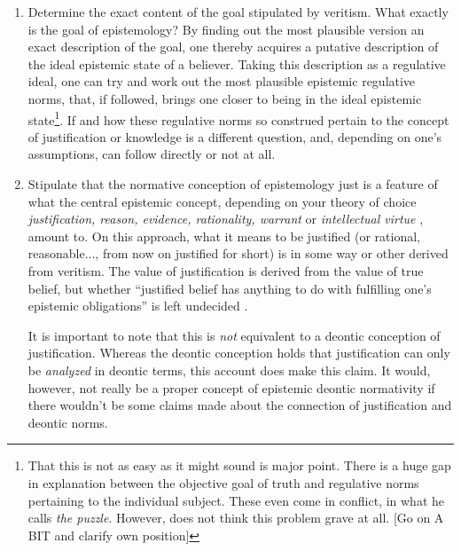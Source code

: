 \documentclass[12pt,numbers=noenddot]{scrartcl}
\begin{document}
\begin{enumerate}
    \item Determine the exact content of the goal stipulated by veritism. What exactly is the goal of epistemology? By finding out the most plausible version an exact description of the goal, one thereby acquires a putative description of the ideal epistemic state of a believer. Taking this description as a regulative ideal, one can try and work out the most plausible epistemic regulative norms, that, if followed, brings one closer to being in the ideal epistemic state\footnote{That this is not as easy as it might sound is \textcite{Gibbons2013-GIBTNO} major point. There is a huge gap in explanation between the objective goal of truth and regulative norms pertaining to the individual subject. These even come in conflict, in what he calls \emph{the puzzle}. However, \textcite{Goldman2002-GOLTUO-2} does not think this problem grave at all. [Go on A BIT and clarify own position]}.
    If and how these regulative norms so construed pertain to the concept of justification or knowledge is a different question, and, depending on one's assumptions, can follow directly or not at all.
    \item Stipulate that the normative conception of epistemology just is a feature of what the central epistemic concept, depending on your theory of choice \emph{justification, reason, evidence, rationality, warrant} or \emph{intellectual virtue} \autocite[153]{David2001-DAVTAT-7}, amount to. On this approach, what it means to be justified (or rational, reasonable..., from now on justified for short) is in some way or other derived from veritism. The value of justification is derived from the value of true belief, but whether “justified belief has anything to do with fulfilling one's epistemic obligations” is left undecided \autocite[66]{Steup1988-STETDC}.

    It is important to note that this is \emph{not} equivalent to a deontic conception of justification. Whereas the deontic conception holds that justification can only be \emph{analyzed} in deontic terms, this account does make this claim. It would, however, not really be a proper concept of epistemic deontic normativity if there wouldn't be some claims made about the connection of justification and deontic norms.
\end{enumerate}
\end{document}
